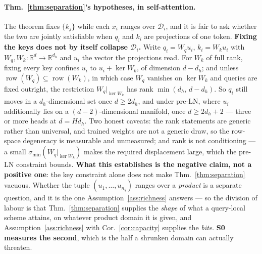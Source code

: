 \documentclass{article}
\begin{document}
\paragraph{Thm.~\ref{thm:separation}'s hypotheses, in self-attention.} The theorem fixes
$\{k_j\}$ while each $x_i$ ranges over $\mathcal{D}_i$, and it is fair to ask whether the two are
jointly satisfiable when $q_i$ and $k_i$ are projections of one token. \textbf{Fixing the keys
does not by itself collapse $\mathcal{D}_i$.} Write $q_i=W_q u_i$, $k_i=W_k u_i$ with
$W_q,W_k:\mathbb{R}^d\to\mathbb{R}^{d_h}$ and $u_i$ the vector the projections read. For $W_k$ of
full rank, fixing every key confines $u_i$ to $u_i+\ker W_k$, of dimension $d-d_h$; and unless
$\operatorname{row}(W_q)\subseteq\operatorname{row}(W_k)$, in which case $W_q$ vanishes on
$\ker W_k$ and queries are fixed outright, the restriction $W_q|_{\ker W_k}$ has rank
$\min(d_h,\,d-d_h)$. So $q_i$ still moves in a $d_h$-dimensional set once $d\ge 2d_h$, and
under pre-LN, where $u_i$ additionally lies on a $(d{-}2)$-dimensional manifold, once
$d\ge 2d_h+2$ --- three or more heads at $d=Hd_h$. Two honest caveats: the rank statements are
generic rather than universal, and trained weights are not a generic draw, so the row-space
degeneracy is measurable and unmeasured; and rank is not conditioning --- a small
$\sigma_{\min}(W_q|_{\ker W_k})$ makes the required displacement large, which the pre-LN
constraint bounds. \textbf{What this establishes is the negative claim, not a positive one}: the
key constraint alone does not make Thm.~\ref{thm:separation} vacuous. Whether the tuple
$(u_1,\dots,u_{n_q})$ ranges over a \emph{product} is a separate question, and it is the one
Assumption~\ref{ass:richness} answers --- so the division of labour is that
Thm.~\ref{thm:separation} supplies the \emph{shape} of what a query-local scheme attains, on
whatever product domain it is given, and Assumption~\ref{ass:richness} with
Cor.~\ref{cor:capacity} supplies the \emph{bite}. \textbf{S0 measures the second}, which is the
half a shrunken domain can actually threaten.
\end{document}

